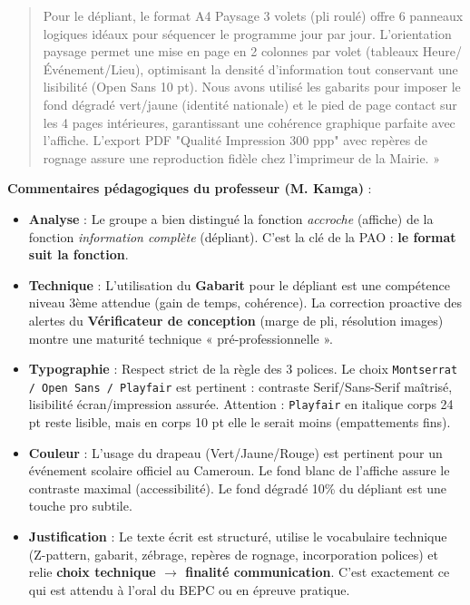 \documentclass[11pt]{article}
\begin{document}
\begin{exoresolu}
\begin{quote}
{Pour le dépliant, le format A4 Paysage 3 volets (pli roulé) offre 6 panneaux logiques idéaux pour séquencer le programme jour par jour. L'orientation paysage permet une mise en page en 2 colonnes par volet (tableaux Heure/Événement/Lieu), optimisant la densité d'information tout conservant une lisibilité (Open Sans 10 pt). Nous avons utilisé les gabarits pour imposer le fond dégradé vert/jaune (identité nationale) et le pied de page contact sur les 4 pages intérieures, garantissant une cohérence graphique parfaite avec l'affiche. L'export PDF "Qualité Impression 300 ppp" avec repères de rognage assure une reproduction fidèle chez l'imprimeur de la Mairie. »}
\end{quote}
\tcblower
\textbf{Commentaires pédagogiques du professeur (M. Kamga)} :
\begin{itemize}
    \item \textbf{Analyse} : Le groupe a bien distingué la fonction \emph{accroche} (affiche) de la fonction \emph{information complète} (dépliant). C'est la clé de la PAO : \textbf{le format suit la fonction}.
    \item \textbf{Technique} : L'utilisation du \textbf{Gabarit} pour le dépliant est une compétence niveau 3ème attendue (gain de temps, cohérence). La correction proactive des alertes du \textbf{Vérificateur de conception} (marge de pli, résolution images) montre une maturité technique « pré-professionnelle ».
    \item \textbf{Typographie} : Respect strict de la règle des 3 polices. Le choix \texttt{Montserrat / Open Sans / Playfair} est pertinent : contraste Serif/Sans-Serif maîtrisé, lisibilité écran/impression assurée. Attention : \texttt{Playfair} en italique corps 24 pt reste lisible, mais en corps 10 pt elle le serait moins (empattements fins).
    \item \textbf{Couleur} : L'usage du drapeau (Vert/Jaune/Rouge) est pertinent pour un événement scolaire officiel au Cameroun. Le fond blanc de l'affiche assure le contraste maximal (accessibilité). Le fond dégradé 10\% du dépliant est une touche pro subtile.
    \item \textbf{Justification} : Le texte écrit est structuré, utilise le vocabulaire technique (Z-pattern, gabarit, zébrage, repères de rognage, incorporation polices) et relie \textbf{choix technique $\rightarrow$ finalité communication}. C'est exactement ce qui est attendu à l'oral du BEPC ou en épreuve pratique.
\end{itemize}
\end{exoresolu}
\end{document}
